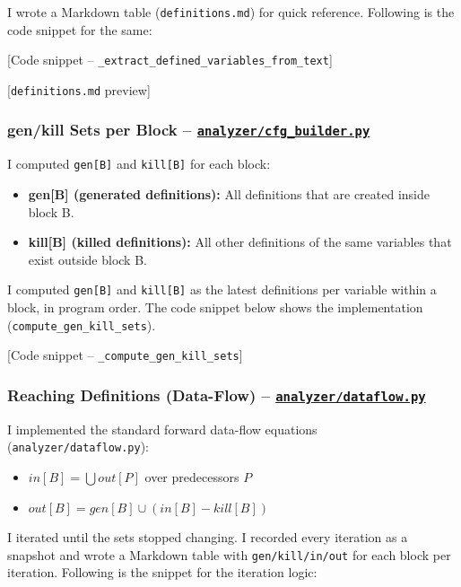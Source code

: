 I wrote a Markdown table (\texttt{definitions.md}) for quick reference. Following is the code snippet for the same:

[Code snippet -- \texttt{\_extract\_defined\_variables\_from\_text}]

[\texttt{definitions.md} preview]

\subsubsection{gen/kill Sets per Block -- \href{https://github.com/ShardulJunagade/cs202-stt/tree/main/lab7/analyzer/cfg_builder.py}{\texttt{analyzer/cfg\_builder.py}}}

I computed \texttt{gen[B]} and \texttt{kill[B]} for each block:
\begin{itemize}[itemsep=0em, topsep=0pt]
    \item \textbf{gen[B] (generated definitions):} All definitions that are created inside block B.
    \item \textbf{kill[B] (killed definitions):} All other definitions of the same variables that exist outside block B.
\end{itemize}
I computed \texttt{gen[B]} and \texttt{kill[B]} as the latest definitions per variable within a block, in program order. The code snippet below shows the implementation (\texttt{compute\_gen\_kill\_sets}).

[Code snippet -- \texttt{\_compute\_gen\_kill\_sets}]


\subsubsection{Reaching Definitions (Data-Flow) -- \href{https://github.com/ShardulJunagade/cs202-stt/tree/main/lab7/analyzer/dataflow.py}{\texttt{analyzer/dataflow.py}}}
I implemented the standard forward data-flow equations (\texttt{analyzer/dataflow.py}):
\begin{itemize}[itemsep=0em, topsep=0pt]
    \item $in[B] = \bigcup out[P]$ over predecessors $P$
    \item $out[B] = gen[B] \cup (in[B] - kill[B])$
\end{itemize}

I iterated until the sets stopped changing. I recorded every iteration as a snapshot and wrote a Markdown table with \texttt{gen/kill/in/out} for each block per iteration. Following is the snippet for the iteration logic:

